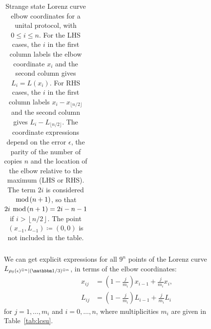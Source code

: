 \documentclass[pra,
aps,
twocolumn,
superscriptaddress,
groupedaddress,
nofootinbib,
reprint
]{revtex4-1}
\begin{document}
\begin{table}[h]
\begin{tabular}{c|c|c|r|r}
  \end{tabular}
  \caption{Strange state Lorenz curve elbow coordinates for a unital protocol, with $0 \leq i \leq n$. 
  For the LHS cases, the $i$ in the first column labels the elbow coordinate $x_i$ and the second column gives $L_i=L(x_i)$. For RHS cases, the $i$ in the first column labels $x_i - x_{\lfloor n/2 \rfloor}$ and the second column gives $L_i - L_{\lfloor n/2 \rfloor}$.
  The coordinate expressions depend on the error $\epsilon$, the parity of the number of copies $n$ and the location of the elbow relative to the maximum (LHS or RHS).
  The term $2i$ is considered $\hspace{-6pt}\mod{\hspace{-2pt}(n+1)}$, so that $2i\ \hspace{-6pt}\mod{\hspace{-2pt}(n+1)} = 2i - n - 1$ if $i > \left\lfloor n/2 \right\rfloor$.
  The point $(x_{-1}, L_{-1}) \coloneqq (0,0)$ is not included in the table.
  }
  \label{tab:lcsu_coord_elb_app}
\end{table}

We can get explicit expressions for all $9^{n}$ points of the Lorenz curve $\lc{\rho_{\rm{S}}(\epsilon)^{\otimes n}}{(\id/3)^{\otimes n}}$, in terms of the elbow coordinates:
\begin{align}
    x_{ij} &= \left( 1-\frac{j}{m_{i}} \right) x_{i-1} + \frac{j}{m_{i}} x_{i}, \label{eq:x}\\
    L_{ij} &= \left( 1-\frac{j}{m_{i}} \right) L_{i-1} + \frac{j}{m_{i}} L_{i} \label{eq:l}
\end{align}
for $j = 1,\dots,m_{i}$ and $i=0,\dots,n$, where multiplicities $m_i$ are given in Table~\ref{tab:lcsu}.
\end{document}

